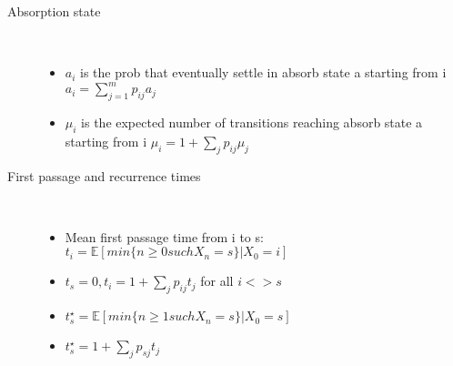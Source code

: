 \documentclass[a4paper, 10pt,landscape]{article}
\begin{document}
\begin{multicols*}{4}
\begin{description}
\begin{itemize}
		\end{itemize}
	\item[Absorption state]~
		\begin{itemize}
			\item $a_i$ is the prob that eventually settle in absorb state a starting from i $a_i = \sum_{j=1}^m p_{ij}a_j$
			\item $\mu_i$ is the expected number of transitions reaching absorb state a starting from i $\mu_i = 1 + \sum_j p_{ij}\mu_j$
		\end{itemize}
	\item[First passage and recurrence times]~
		\begin{itemize}
			\item Mean first passage time from i to s: $t_i = \mathbb{E}[min\{n \geq 0 such X_n=s\}|X_0=i]$ 
			\item $t_s =0,  t_i = 1 + \sum_j p_{ij}t_j$ for all $i <> s$
			\item $t_s^{\star} = \mathbb{E}[min\{n \geq 1 such X_n=s\}|X_0=s]$ 
			\item $t_s^{\star} = 1 + \sum_j p_{sj}t_j$
		\end{itemize}
\end{description}


\end{multicols*}
\end{document}
